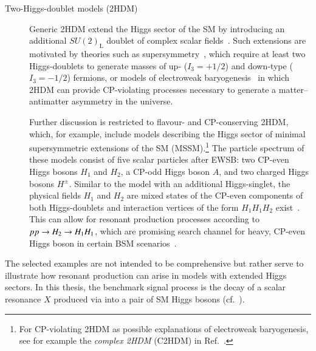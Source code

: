 \begin{description}
\item[Two-Higgs-doublet models (2HDM)] Generic 2HDM extend the Higgs sector of
  the SM by introducing an additional $SU(2)_{\text{L}}$ doublet of complex
  scalar fields~\cite{Gunion:1989we,Branco:2011iw}. Such extensions are
  motivated by theories such as supersymmetry~\cite{Haber:1984rc}, which require
  at least two Higgs-doublets to generate masses of up- ($I_3 = + 1/2$) and
  down-type ($I_3 = - 1/2$) fermions, or models of electroweak
  baryogenesis~\cite{Trodden:1998ym} in which 2HDM can provide CP-violating
  processes necessary to generate a matter--antimatter asymmetry in the universe.

  Further discussion is restricted to flavour- and CP-conserving 2HDM, which,
  for example, include models describing the Higgs sector of minimal
  supersymmetric extensions of the SM (MSSM).\footnote{For CP-violating 2HDM as
    possible explanations of electroweak baryogenesis, see for example the
    \emph{complex 2HDM} (C2HDM) in Ref.~\cite{Fontes:2017zfn}.}
  The particle spectrum of these models consist of five scalar particles after
  EWSB: two CP-even Higgs bosons $H_1$ and $H_2$, a CP-odd Higgs boson $A$, and
  two charged Higgs bosons $H^\pm$. Similar to the model with an additional
  Higgs-singlet, the physical fields $H_1$ and $H_2$ are mixed states of the
  CP-even components of both Higgs-doublets and interaction vertices of the form
  $H_1 H_1 H_2$ exist~\cite{Gunion:1989we,Branco:2011iw}. This can allow for
  resonant production processes according to $pp \to H_2 \to H_1 H_1$, which
  are promising search channel for heavy, CP-even Higgs boson in certain BSM
  scenarios~\cite{Dolan:2012ac,Djouadi:2013vqa,Djouadi:2013uqa}.

\end{description}
The selected examples are not intended to be comprehensive but rather serve to
illustrate how resonant \HH production can arise in models with extended Higgs
sectors. In this thesis, the benchmark signal process is the decay of a scalar
resonance $X$ produced via \ggF into a pair of SM Higgs bosons
(cf.~).

